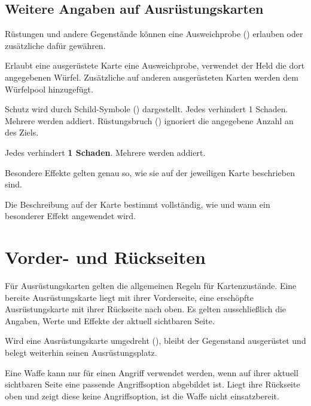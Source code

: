 \subsection{Weitere Angaben auf Ausrüstungskarten}

Rüstungen und andere Gegenstände können eine Ausweichprobe (\evade) erlauben oder zusätzliche \blueDie{} dafür gewähren.

\begin{beispiel}[title=Beispiel: Ausweichen durch Ausrüstung]
Erlaubt eine ausgerüstete Karte eine Ausweichprobe, verwendet der Held die dort angegebenen Würfel. Zusätzliche \blueDie{} auf anderen ausgerüsteten Karten werden dem Würfelpool hinzugefügt.
\end{beispiel}

Schutz wird durch Schild-Symbole (\armor) dargestellt. Jedes \armor{} verhindert 1 Schaden. Mehrere \armor{} werden addiert. Rüstungsbruch (\armorPierce) ignoriert die angegebene Anzahl an \armor{} des Ziels.

\begin{kurzregel}[title=Schutz durch Schilde]
Jedes \armor{} verhindert \textbf{1 Schaden}. Mehrere \armor{} werden addiert.
\end{kurzregel}

Besondere Effekte gelten genau so, wie sie auf der jeweiligen Karte beschrieben sind.

\begin{kurzregel}[title=Besondere Effekte]
Die Beschreibung auf der Karte bestimmt vollständig, wie und wann ein besonderer Effekt angewendet wird.
\end{kurzregel}

\section{Vorder- und Rückseiten}

Für Ausrüstungskarten gelten die allgemeinen Regeln für Kartenzustände. Eine bereite Ausrüstungskarte liegt mit ihrer Vorderseite, eine erschöpfte Ausrüstungskarte mit ihrer Rückseite nach oben. Es gelten ausschließlich die Angaben, Werte und Effekte der aktuell sichtbaren Seite.

Wird eine Ausrüstungskarte umgedreht (\exhaust), bleibt der Gegenstand ausgerüstet und belegt weiterhin seinen Ausrüstungsplatz.

Eine Waffe kann nur für einen Angriff verwendet werden, wenn auf ihrer aktuell sichtbaren Seite eine passende Angriffsoption abgebildet ist. Liegt ihre Rückseite oben und zeigt diese keine Angriffsoption, ist die Waffe nicht einsatzbereit.


